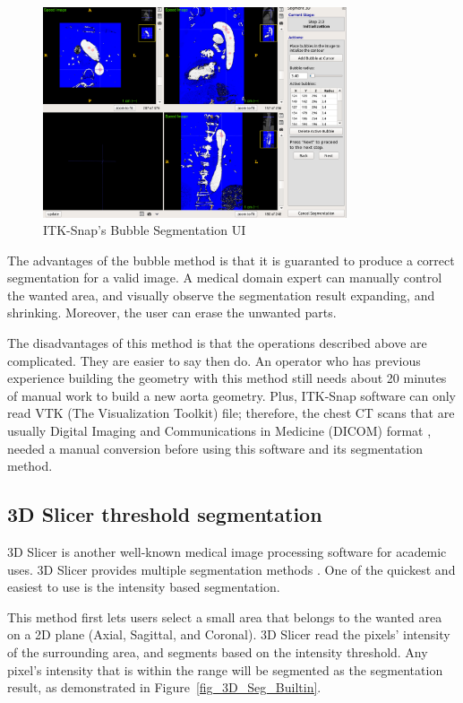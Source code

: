 \begin{figure}[ht]
    \centering
    \includegraphics[width=0.8\textwidth]{figures/AGR/bubbles.png}
    \caption[ITK-Snap's Bubble Segmentation UI]{ITK-Snap's Bubble Segmentation UI \cite{py06nimg}}
    \label{fig_ITK}
\end{figure}

The advantages of the bubble method is that it is guaranted to produce a correct segmentation for a valid image. A medical domain expert can manually control the wanted area, and visually observe the segmentation result expanding, and shrinking. Moreover, the user can erase the unwanted parts.

The disadvantages of this method is that the operations described above are complicated. They are easier to say then do. An operator who has previous experience building the geometry with this method still needs about 20 minutes of manual work to build a new aorta geometry. Plus, ITK-Snap software can only read VTK (The Visualization Toolkit) file; therefore, the chest CT scans that are usually Digital Imaging and Communications in Medicine (DICOM) format \cite{10.1007/978-1-4020-8752-3_13}, needed a manual conversion before using this software and its segmentation method.

\subsection{3D Slicer threshold segmentation}
3D Slicer is another well-known medical image processing software for academic uses. 3D Slicer provides multiple segmentation methods \cite{Slicer_Wiki}. One of the quickest and easiest to use is the intensity based segmentation.

This method first lets users select a small area that belongs to the wanted area on a 2D plane (Axial, Sagittal, and Coronal). 3D Slicer read the pixels' intensity of the surrounding area, and segments based on the intensity threshold. Any pixel's intensity that is within the range will be segmented as the segmentation result, as demonstrated in Figure~\ref{fig_3D_Seg_Builtin}. 

